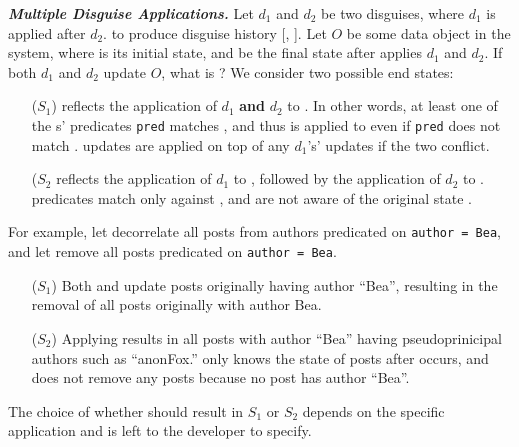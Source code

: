 \vspace{6pt}\noindent\textbf{\emph{Multiple Disguise Applications.}}
Let $d_1$ and $d_2$ be two disguises, where $d_1$ is applied after $d_2$.
to produce disguise history [, ]. 
%
Let $O$ be some data object in the system, where \ostart is its initial state, and
 be the final state after \sys applies $d_1$ and $d_2$.
%
If both $d_1$ and $d_2$ update $O$, what is ?
We consider two possible end states: 
%
\begin{enumerate}
\item[($S_1$)]  reflects the application of $d_1$ \textbf{and} $d_2$ to \ostart. In other
words, at least one of the s' predicates \texttt{pred} matches \ostart, and thus  is
applied to \ohist[\app{d_1}] even if \texttt{pred} does not match \ohist[\app{d_1}]. 
 updates are applied on top of any $d_1$'s' updates if the two conflict.

\item[($S_2$]  reflects the application of $d_1$ to \ostart, followed
by the application of $d_2$ to \ohist{[\app{d_1}]}.  predicates match only against
\ohist{[\app{d_1}]}, and are not aware of the original state \ostart.
\end{enumerate}

\noindent
For example, let  decorrelate all posts from authors predicated
on \texttt{author = Bea}, and let  remove all posts predicated on \texttt{author = Bea}.
%
\begin{enumerate}
\item[($S_1$)] Both  and  update posts originally having author ``Bea'', resulting in the
removal of all posts originally with author Bea.

\item[($S_2$)] Applying  results in all posts with author ``Bea'' having
pseudoprinicipal authors such as ``anonFox.''  only knows the state of posts after
 occurs, and does not remove any posts because no post has author ``Bea''.
\end{enumerate}

The choice of whether  should result in $S_1$ or $S_2$ depends on the
specific application and is left to the developer to specify. 

